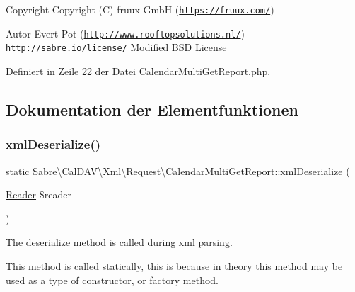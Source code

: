 \begin{DoxyCopyright}{Copyright}
Copyright (C) fruux GmbH (\href{https://fruux.com/}{\tt https\+://fruux.\+com/}) 
\end{DoxyCopyright}
\begin{DoxyAuthor}{Autor}
Evert Pot (\href{http://www.rooftopsolutions.nl/}{\tt http\+://www.\+rooftopsolutions.\+nl/})  \href{http://sabre.io/license/}{\tt http\+://sabre.\+io/license/} Modified B\+SD License 
\end{DoxyAuthor}


Definiert in Zeile 22 der Datei Calendar\+Multi\+Get\+Report.\+php.



\subsection{Dokumentation der Elementfunktionen}
\mbox{\label{class_sabre_1_1_cal_d_a_v_1_1_xml_1_1_request_1_1_calendar_multi_get_report_a1a139508f2c505c2cf06dca45ad94d64}} 
\subsubsection{\texorpdfstring{xml\+Deserialize()}{xmlDeserialize()}}
{\footnotesize\ttfamily static Sabre\textbackslash{}\+Cal\+D\+A\+V\textbackslash{}\+Xml\textbackslash{}\+Request\textbackslash{}\+Calendar\+Multi\+Get\+Report\+::xml\+Deserialize (\begin{DoxyParamCaption}\item[{\mbox{\hyperlink{class_sabre_1_1_xml_1_1_reader}{Reader}}}]{\$reader }\end{DoxyParamCaption})\hspace{0.3cm}{\ttfamily [static]}}

The deserialize method is called during xml parsing.

This method is called statically, this is because in theory this method may be used as a type of constructor, or factory method.

